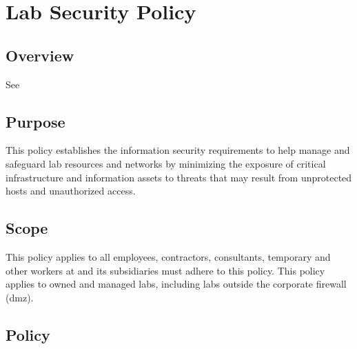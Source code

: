 \chapter{Lab Security Policy}\label{SS:LSP}
\CommonIntroduction
\section{Overview}
See 
\section{Purpose}\label{SS:LSP:Pu}
This policy establishes the information security requirements to help manage and safeguard lab resources and \CompanyName{} networks by minimizing the exposure of critical infrastructure and information assets to threats that may result from unprotected hosts and unauthorized access.
\section{Scope}
This policy applies to all employees, contractors, consultants, temporary\oxford{} and other workers at \CompanyName{} and its subsidiaries must adhere to this policy.  
This policy applies to \CompanyName{} owned and managed labs, including labs outside the corporate firewall (\gls{dmz}). 
\section{Policy}
